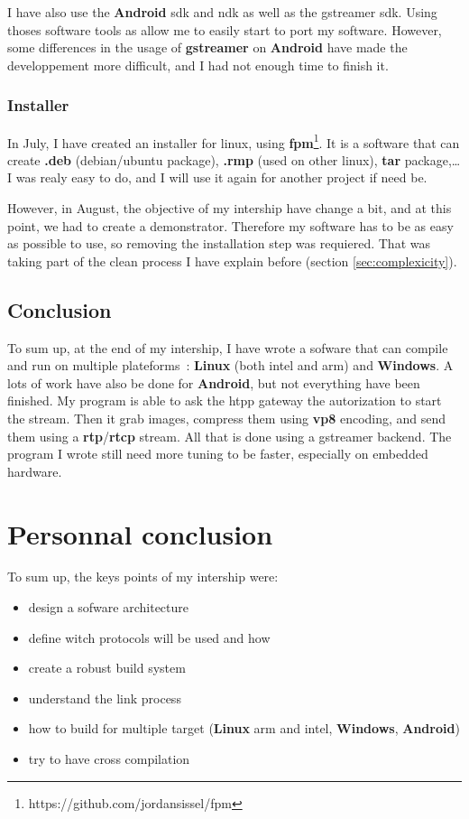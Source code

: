 \documentclass[a4paper,11pt]{custom}
\newcommand{\rtp}{\textbf{rtp}\xspace}
\newcommand{\rtcp}{\textbf{rtcp}\xspace}
\newcommand{\gstreamer}{\textbf{gstreamer}\xspace}
\newcommand{\vpx}{\textbf{vp8}\xspace}
\newcommand{\fpm}{\textbf{fpm}\xspace}
\newcommand{\linux}{\textbf{Linux}\xspace}
\newcommand{\win}{\textbf{Windows}\xspace}
\newcommand{\android}{\textbf{Android}\xspace}
\begin{document}
I have also use the \android{} sdk and ndk as well as the gstreamer sdk. Using
thoses software tools as allow me to easily start to port my software. However,
some differences in the usage of \gstreamer{} on \android{} have made the
developpement more difficult, and I had not enough time to finish it.

\subsection{Installer}

In July, I have created an installer for linux, using
\fpm{}\footnote{https://github.com/jordansissel/fpm}. It is a software that can
create \textbf{.deb} (debian/ubuntu package), \textbf{.rmp} (used on other
linux), \textbf{tar} package,… I was realy easy to do, and I will use it again
for another project if need be.

However, in August, the objective of my intership have change a bit, and at this
point, we had to create a demonstrator. Therefore my software has to be as easy
as possible to use, so removing the installation step was requiered. That was
taking part of the clean process I have explain before (section
\ref{sec:complexicity}).

\section{Conclusion}

To sum up, at the end of my intership, I have wrote a sofware that can compile
and run on multiple plateforms~: \linux{} (both intel and arm) and \win. A lots
of work have also be done for \android, but not everything have been finished.
My program is able to ask the htpp gateway the autorization to start the stream.
Then it grab images, compress them using \vpx{} encoding, and send them using a
\rtp{}/\rtcp{} stream. All that is done using a gstreamer backend. The program I
wrote still need more tuning to be faster, especially on embedded hardware.

\chapter{Personnal conclusion}

To sum up, the keys points of my intership were:
\begin{multicols}{2}
\begin{itemize}
\item design a sofware architecture
\item define witch protocols will be used and how
\item create a robust build system
\item understand the link process
\item how to build for multiple target (\linux{} arm and intel, \win, \android)
\item try to have cross compilation
\end{itemize}
\end{multicols}
\end{document}
